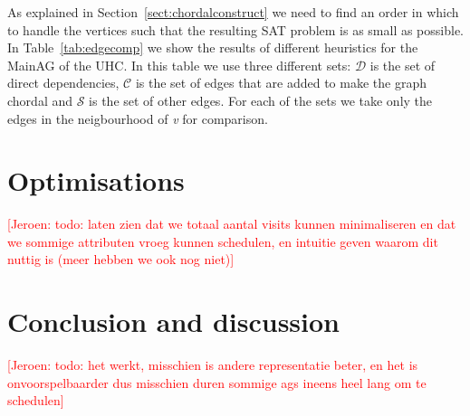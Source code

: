 \documentclass{llncs}
\newif\iffinal\finalfalse
\newcommand{\REM}[3]{\iffinal\else\textcolor{#2}{[#1: #3]}\fi}
\newcommand{\Jeroen}[1]{\REM{Jeroen}{red}{#1}}
\newcommand{\tabref}[1]{Table~\ref{#1}}
\newcommand{\sectref}[1]{Section~\ref{#1}}
\DeclareRobustCommand{\VAN}[3]{#2}
\begin{document}
As explained in \sectref{sect:chordalconstruct} we need to find an order in which to handle the vertices such that the resulting SAT problem is as small as possible. In \tabref{tab:edgecomp} we show the results of different heuristics for the MainAG of the UHC. In this table we use three different sets: $\mathcal{D}$ is the set of direct dependencies, $\mathcal{C}$ is the set of edges that are added to make the graph chordal and $\mathcal{S}$ is the set of other edges. For each of the sets we take only the edges in the neigbourhood of \emph{v} for comparison.

\section{Optimisations} \label{sect:optimisations}
\Jeroen{todo: laten zien dat we totaal aantal visits kunnen minimaliseren en dat we sommige attributen vroeg kunnen schedulen, en intuitie geven waarom dit nuttig is (meer hebben we ook nog niet)}

\section{Conclusion and discussion} \label{sect:conclusion}
\Jeroen{todo: het werkt, misschien is andere representatie beter, en het is onvoorspelbaarder dus misschien duren sommige ags ineens heel lang om te schedulen}


\DeclareRobustCommand{\VAN}[3]{#3}


\end{document}
